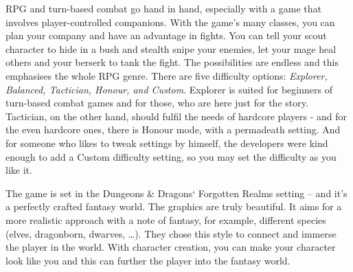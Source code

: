 \documentclass[a4paper,11pt,english]{article}
\begin{document}
RPG and turn-based combat go hand in hand, especially with a game that involves player-controlled companions. With the game's many classes, you can plan your company and have an advantage in fights. You can tell your scout character to hide in a bush and stealth snipe your enemies, let your mage heal others and your berserk to tank the fight. The possibilities are endless and this emphasises the whole RPG genre.
There are five difficulty options: \textit{Explorer, Balanced, Tactician, Honour, and Custom}. Explorer is suited for beginners of turn-based combat games and for those, who are here just for the story. Tactician, on the other hand, should fulfil the needs of hardcore players - and for the even hardcore ones, there is Honour mode, with a permadeath setting. And for someone who likes to tweak settings by himself, the developers were kind enough to add a Custom difficulty setting, so you may set the difficulty as you like it.

The game is set in the Dungeons \& Dragons‘ Forgotten Realms setting – and it’s a perfectly crafted fantasy world. The graphics are truly beautiful. It aims for a more realistic approach with a note of fantasy, for example, different species (elves, dragonborn, dwarves, …). They chose this style to connect and immerse the player in the world. With character creation, you can make your character look like you and this can further the player into the fantasy world. 
\end{document}
